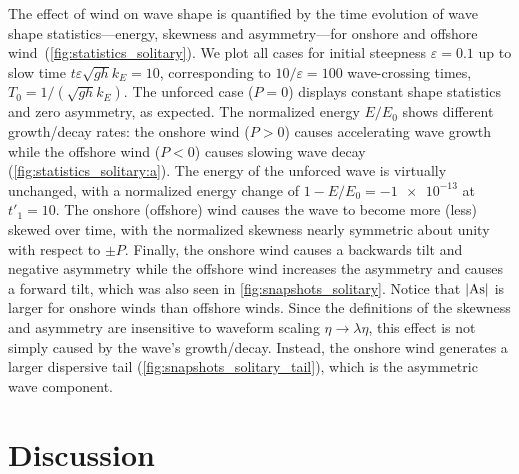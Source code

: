 \documentclass{jfm}
\DeclareMathOperator{\As}{As}
\renewcommand*{\epsilon}{\varepsilon}
\begin{document}
The effect of wind on wave shape is quantified by the time evolution of
wave shape statistics---energy, skewness and asymmetry---for onshore
and offshore wind~(\cref{fig:statistics_solitary}).
We plot all cases for initial steepness $\epsilon = 0.1$ up to slow time
$t \epsilon \sqrt{g h} k_E = 10$, corresponding to $10/\epsilon = 100$
wave-crossing times, $T_0 = 1/(\sqrt{gh} k_E)$.
The unforced case ($P=0$) displays constant shape statistics and zero
asymmetry, as expected.
The normalized energy $E/E_0$ shows different growth/decay rates:
the onshore wind ($P>0$) causes accelerating wave growth while the
offshore wind ($P<0$) causes slowing wave decay
(\cref{fig:statistics_solitary:a}).
The energy of the unforced wave is virtually unchanged, with a
normalized energy change of $1-E/E_0 = \num{-1e-13}$ at $t'_1 = 10$.
The onshore (offshore) wind causes the wave to become more (less) skewed
over time, with the normalized skewness nearly symmetric about unity
with respect to $\pm P$.
Finally, the onshore wind causes a backwards tilt and negative asymmetry
while the offshore wind increases the asymmetry and causes a forward
tilt, which was also seen in \cref{fig:snapshots_solitary}.
Notice that $\abs{\As}$ is larger for onshore winds than offshore winds.
Since the definitions of the skewness and asymmetry are insensitive to
waveform scaling $\eta \to \lambda \eta$, this effect is not simply
caused by the wave's growth/decay.
Instead, the onshore wind generates a larger dispersive tail
(\cref{fig:snapshots_solitary_tail}), which is the asymmetric wave
component.

\section{\label{sec:discussion} Discussion}
\end{document}
